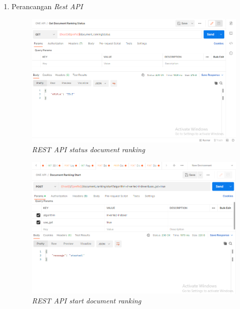 \begin{enumerate}[label=\alph*)., leftmargin=1\parindent]
	\item{Perancangan \textit{Rest API}}

	\begin{figure}[H]
		\centering
		\includegraphics[keepaspectratio, width=13cm]{gambar/rest_document_ranking_status.png}
		\caption{\textit{REST API status document ranking} }
		\label{gambar:rest_document_ranking_status.png}
	\end{figure}


	\begin{figure}[H]
		\centering
		\includegraphics[keepaspectratio, width=13cm]{gambar/rest_document_ranking_start.png}
		\caption{\textit{REST API start document ranking} }
		\label{gambar:rest_document_ranking_start.png}
	\end{figure}
	

\end{enumerate}
